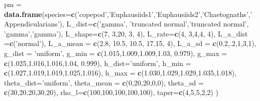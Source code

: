 \documentclass[
]{article}
\newenvironment{Shaded}{\begin{snugshade}}{\end{snugshade}}
\newcommand{\DataTypeTok}[1]{\textcolor[rgb]{0.13,0.29,0.53}{#1}}
\newcommand{\DecValTok}[1]{\textcolor[rgb]{0.00,0.00,0.81}{#1}}
\newcommand{\FloatTok}[1]{\textcolor[rgb]{0.00,0.00,0.81}{#1}}
\newcommand{\KeywordTok}[1]{\textcolor[rgb]{0.13,0.29,0.53}{\textbf{#1}}}
\newcommand{\NormalTok}[1]{#1}
\newcommand{\StringTok}[1]{\textcolor[rgb]{0.31,0.60,0.02}{#1}}
\begin{document}
\begin{Shaded}
\begin{Highlighting}[]
\NormalTok{pm =}\StringTok{ }\KeywordTok{data.frame}\NormalTok{(}\DataTypeTok{species=}\KeywordTok{c}\NormalTok{(}\StringTok{'copepod'}\NormalTok{,}\StringTok{'Euphausiids1'}\NormalTok{,}\StringTok{'Euphausiids2'}\NormalTok{,}\StringTok{'Chaetognaths'}\NormalTok{,}\StringTok{'Appendicularians'}\NormalTok{),}
  \DataTypeTok{L_dist=}\KeywordTok{c}\NormalTok{(}\StringTok{'gamma'}\NormalTok{, }\StringTok{'truncated normal'}\NormalTok{,}\StringTok{'truncated normal'}\NormalTok{, }\StringTok{'gamma'}\NormalTok{,}\StringTok{'gamma'}\NormalTok{),}
  \DataTypeTok{L_shape=}\KeywordTok{c}\NormalTok{(}\DecValTok{7}\NormalTok{, }\DecValTok{3}\NormalTok{,}\DecValTok{20}\NormalTok{, }\DecValTok{3}\NormalTok{, }\DecValTok{4}\NormalTok{),}
  \DataTypeTok{L_rate=}\KeywordTok{c}\NormalTok{(}\DecValTok{4}\NormalTok{, }\DecValTok{3}\NormalTok{,}\DecValTok{4}\NormalTok{,}\DecValTok{4}\NormalTok{, }\DecValTok{4}\NormalTok{),}
  \DataTypeTok{L_a_dist =}\KeywordTok{c}\NormalTok{(}\StringTok{'normal'}\NormalTok{),}
  \DataTypeTok{L_a_mean =} \KeywordTok{c}\NormalTok{(}\FloatTok{2.8}\NormalTok{, }\FloatTok{10.5}\NormalTok{, }\FloatTok{10.5}\NormalTok{, }\FloatTok{17.15}\NormalTok{, }\DecValTok{4}\NormalTok{),}
  \DataTypeTok{L_a_sd =} \KeywordTok{c}\NormalTok{(}\FloatTok{0.2}\NormalTok{,.}\DecValTok{2}\NormalTok{,}\DecValTok{1}\NormalTok{,}\DecValTok{3}\NormalTok{,}\DecValTok{1}\NormalTok{),}
  \DataTypeTok{g_dist =} \StringTok{'uniform'}\NormalTok{,}
  \DataTypeTok{g_min =} \KeywordTok{c}\NormalTok{(}\FloatTok{1.015}\NormalTok{,}\FloatTok{1.009}\NormalTok{,}\FloatTok{1.009}\NormalTok{,}\FloatTok{1.03}\NormalTok{, }\FloatTok{0.979}\NormalTok{),}
  \DataTypeTok{g_max =} \KeywordTok{c}\NormalTok{(}\FloatTok{1.025}\NormalTok{,}\FloatTok{1.016}\NormalTok{,}\FloatTok{1.016}\NormalTok{,}\FloatTok{1.04}\NormalTok{, }\FloatTok{0.999}\NormalTok{),}
  \DataTypeTok{h_dist=}\StringTok{'uniform'}\NormalTok{,}
  \DataTypeTok{h_min =} \KeywordTok{c}\NormalTok{(}\FloatTok{1.027}\NormalTok{,}\FloatTok{1.019}\NormalTok{,}\FloatTok{1.019}\NormalTok{,}\FloatTok{1.025}\NormalTok{,}\FloatTok{1.016}\NormalTok{),}
  \DataTypeTok{h_max =} \KeywordTok{c}\NormalTok{(}\FloatTok{1.030}\NormalTok{,}\FloatTok{1.029}\NormalTok{,}\FloatTok{1.029}\NormalTok{,}\FloatTok{1.035}\NormalTok{,}\FloatTok{1.018}\NormalTok{),}
  \DataTypeTok{theta_dist=}\StringTok{'uniform'}\NormalTok{,}
  \DataTypeTok{theta_mean =} \KeywordTok{c}\NormalTok{(}\DecValTok{0}\NormalTok{,}\DecValTok{20}\NormalTok{,}\DecValTok{20}\NormalTok{,}\DecValTok{0}\NormalTok{,}\DecValTok{0}\NormalTok{),}
  \DataTypeTok{theta_sd =} \KeywordTok{c}\NormalTok{(}\DecValTok{30}\NormalTok{,}\DecValTok{20}\NormalTok{,}\DecValTok{20}\NormalTok{,}\DecValTok{30}\NormalTok{,}\DecValTok{20}\NormalTok{),}
  \DataTypeTok{rho_l=}\KeywordTok{c}\NormalTok{(}\DecValTok{100}\NormalTok{,}\DecValTok{100}\NormalTok{,}\DecValTok{100}\NormalTok{,}\DecValTok{100}\NormalTok{,}\DecValTok{100}\NormalTok{),}
  \DataTypeTok{taper=}\KeywordTok{c}\NormalTok{(}\DecValTok{4}\NormalTok{,}\DecValTok{5}\NormalTok{,}\DecValTok{5}\NormalTok{,}\DecValTok{2}\NormalTok{,}\DecValTok{2}\NormalTok{)}
\NormalTok{)}
\end{Highlighting}
\end{Shaded}
\end{document}

